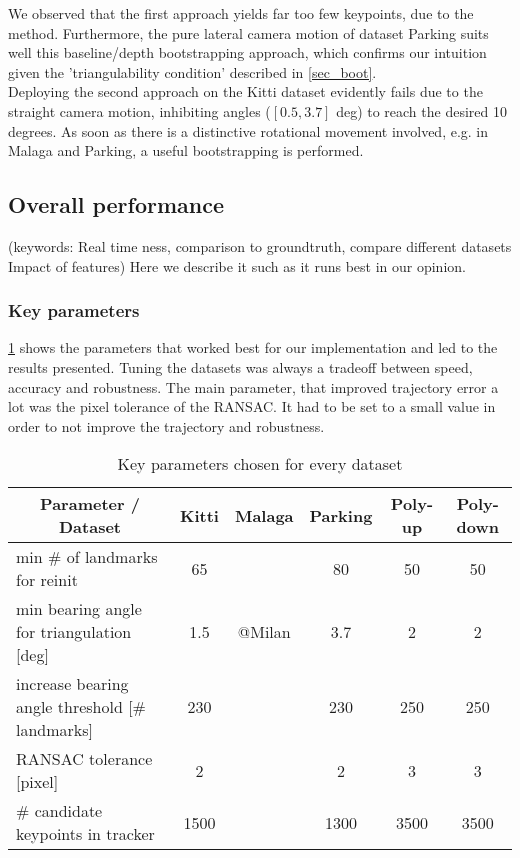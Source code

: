 We observed that the first approach yields far too few keypoints, due to the  method. Furthermore, the pure lateral camera motion of dataset Parking suits well this baseline/depth bootstrapping approach, which confirms our intuition given the 'triangulability condition' described in \cref{sec_boot}.\\

Deploying the second approach on the Kitti dataset evidently fails due to the straight camera motion, inhibiting angles ($[0.5, 3.7]$ deg) to reach the desired 10 degrees. As soon as there is a distinctive rotational movement involved, e.g. in Malaga and Parking, a useful bootstrapping is performed.


\subsection{Overall performance}
\textcolor[rgb]{1,0,0}{(keywords: Real time ness, comparison to groundtruth, compare different datasets
Impact of features) Here we describe it such as it runs best in our opinion.}

\subsubsection{Key parameters}
\cref{params_table} shows the parameters that worked best for our implementation and led to the results presented. Tuning the datasets was always a tradeoff between speed, accuracy and robustness. The main parameter, that improved trajectory error a lot was the pixel tolerance of the RANSAC. It had to be set to a small value in order to not improve the trajectory and robustness.
\begin{table}[!h]
	\centering
	\begin{tabular}{|l|c|c|c|c|c|}
	\hline
	\multicolumn{1}{|c|}{\textbf{Parameter / Dataset}} & \textbf{Kitti} & \textbf{Malaga} & \textbf{Parking} & \textbf{Poly-up} & \textbf{Poly-down} \\ \hline
	min \# of landmarks for reinit                     & 65             &                 & 80               & 50               & 50\\ \hline
	min bearing angle for triangulation {[}deg{]}      & 1.5            &  @Milan         & 3.7              & 2                &
2\\ \hline
	increase bearing angle threshold {[}\# landmarks{]}& 230            &                 & 230              & 250              & 250\\ \hline
	RANSAC tolerance {[}pixel{]}                       & 2              &                 & 2                & 3                &
3\\ \hline
	\# candidate keypoints in tracker                  & 1500           &                 & 1300             & 3500             & 3500\\ \hline
	\end{tabular}
	\caption{Key parameters chosen for every dataset}
	\label{params_table}
\end{table}
	
